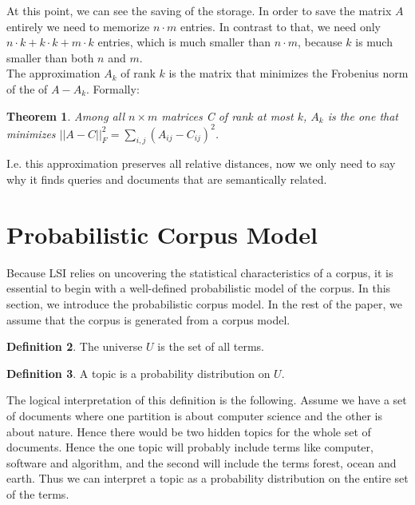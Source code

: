 \documentclass[a4paper,11pt,DIV=15]{scrartcl} %
\theoremstyle{plain}
\newtheorem{theorem}{Theorem}
\theoremstyle{definition}
\newtheorem{definition}[theorem]{Definition}
\begin{document}
At this point, we can see the saving of the storage. In order to save the matrix $A$ entirely we need to memorize $n \cdot m$ entries. In contrast to that, we need only $n \cdot k + k\cdot k + m \cdot k$ entries, which is much smaller than  $n \cdot m$, because $k$ is much smaller than both $n$ and $m$.\\
The approximation $A_k$ of rank $k$ is the matrix that minimizes the Frobenius norm of the of $A - A_k$. Formally:
\begin{theorem}
	\cite{EckartYoung} Among all $n \times m$ matrices C of rank at most $k$, $A_k$ is the one that minimizes $||A - C||_F^2 = \sum_{i,j}(A_{ij} - C_{ij})^2$.
\end{theorem}
I.e. this approximation preserves all relative distances, now we only need to say why it finds queries and documents that are semantically related.








 

\section{Probabilistic Corpus Model} %
Because LSI relies on uncovering the statistical characteristics of a corpus, it is essential to begin with a well-defined probabilistic model of the corpus.
In this section, we introduce the probabilistic corpus model.
In the rest of the paper, we assume that the corpus is generated from a corpus model.

\begin{definition}
The universe $U$ is the set of all terms.
\end{definition}
\begin{definition}
A topic is a probability distribution on $U$.
\end{definition}
The logical interpretation of this definition is the following. Assume we have a set of documents where one partition is about computer science and the other is about nature. Hence there would be two hidden topics for the whole set of documents.
Hence the one topic will probably include terms like computer, software and algorithm, and the second will include the terms forest, ocean and earth. Thus we can interpret a topic as a probability distribution on the entire set of the terms.
\end{document}
